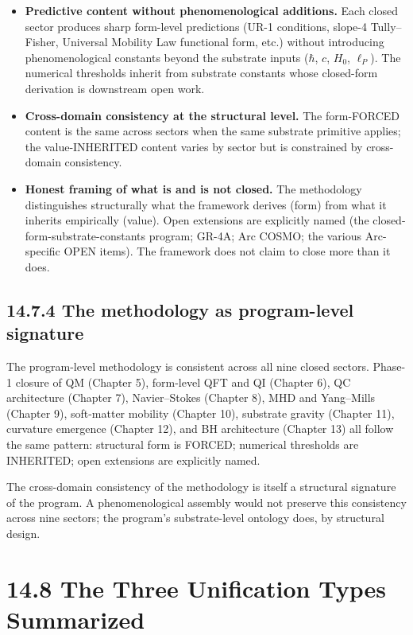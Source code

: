 \documentclass[11pt]{book}
\begin{document}
\begin{itemize}
\item \textbf{Predictive content without phenomenological additions.} Each closed sector produces sharp form-level predictions (UR-1 conditions, slope-4 Tully–Fisher, Universal Mobility Law functional form, etc.) without introducing phenomenological constants beyond the substrate inputs ($\hbar$, $c$, $H_0$, $\ell_P$). The numerical thresholds inherit from substrate constants whose closed-form derivation is downstream open work.
\item \textbf{Cross-domain consistency at the structural level.} The form-FORCED content is the same across sectors when the same substrate primitive applies; the value-INHERITED content varies by sector but is constrained by cross-domain consistency.
\item \textbf{Honest framing of what is and is not closed.} The methodology distinguishes structurally what the framework derives (form) from what it inherits empirically (value). Open extensions are explicitly named (the closed-form-substrate-constants program; GR-4A; Arc COSMO; the various Arc-specific OPEN items). The framework does not claim to close more than it does.
\end{itemize}

\subsection{14.7.4 The methodology as program-level signature}

The program-level methodology is consistent across all nine closed sectors. Phase-1 closure of QM (Chapter 5), form-level QFT and QI (Chapter 6), QC architecture (Chapter 7), Navier–Stokes (Chapter 8), MHD and Yang–Mills (Chapter 9), soft-matter mobility (Chapter 10), substrate gravity (Chapter 11), curvature emergence (Chapter 12), and BH architecture (Chapter 13) all follow the same pattern: structural form is FORCED; numerical thresholds are INHERITED; open extensions are explicitly named.

The cross-domain consistency of the methodology is itself a structural signature of the program. A phenomenological assembly would not preserve this consistency across nine sectors; the program's substrate-level ontology does, by structural design.

\section{14.8 The Three Unification Types Summarized}
\end{document}

